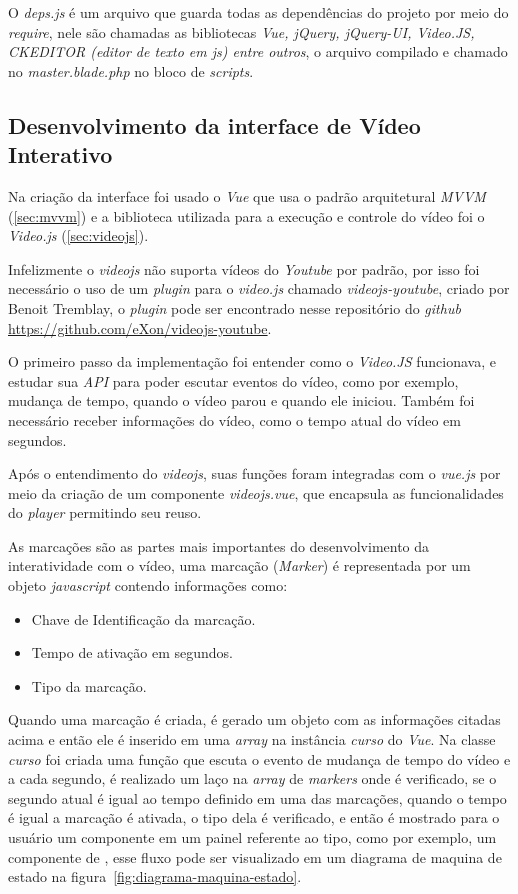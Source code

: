 O \textit{deps.js} é um arquivo que guarda todas as dependências do projeto por meio do \textit{require}, nele são chamadas as bibliotecas \textit{Vue, jQuery, jQuery-UI, Video.JS, CKEDITOR (editor de texto em js) entre outros}, o arquivo compilado e chamado no \textit{master.blade.php} no bloco de \textit{scripts}.

\subsection{Desenvolvimento da interface de Vídeo Interativo}

Na criação da interface foi usado o \textit{Vue} que usa o padrão arquitetural \textit{MVVM} (\autoref{sec:mvvm}) e a biblioteca utilizada para a execução e controle do vídeo foi o \textit{Video.js} (\autoref{sec:videojs}).

Infelizmente o \textit{videojs} não suporta vídeos do \textit{Youtube} por padrão, por isso foi necessário o uso de um \textit{plugin} para o \textit{video.js} chamado \textit{videojs-youtube}, criado por Benoit Tremblay, o \textit{plugin} pode ser encontrado nesse repositório do \textit{github} \url{https://github.com/eXon/videojs-youtube}.

O primeiro passo da implementação foi entender como o \textit{Video.JS} funcionava, e estudar sua \textit{API} para poder escutar eventos do vídeo, como por exemplo, mudança de tempo, quando o vídeo parou e quando ele iniciou. Também foi necessário receber informações do vídeo, como o tempo atual do vídeo em segundos.

Após o entendimento do \textit{videojs}, suas funções foram integradas com o \textit{vue.js} por meio da criação de um componente \textit{videojs.vue}, que encapsula as funcionalidades do \textit{player} permitindo seu reuso.

As marcações são as partes mais importantes do desenvolvimento da interatividade com o vídeo, uma marcação (\textit{Marker}) é representada por um objeto \textit{javascript} contendo informações como:
\begin{itemize}
    \item Chave de Identificação da marcação.
    \item Tempo de ativação em segundos.
    \item Tipo da marcação.
\end{itemize}

Quando uma marcação é criada, é gerado um objeto com as informações citadas acima e então ele é inserido em uma \textit{array} na instância \textit{curso} do \textit{Vue}. Na classe \textit{curso} foi criada uma função que escuta o evento de mudança de tempo do vídeo e a cada segundo, é realizado um laço na \textit{array} de \textit{markers} onde é verificado, se o segundo atual é igual ao tempo definido em uma das marcações, quando o tempo é igual a marcação é ativada, o tipo dela é verificado, e então é mostrado para o usuário um componente em um painel referente ao tipo, como por exemplo, um componente de , esse fluxo pode ser visualizado em um diagrama de maquina de estado na figura~\ref{fig:diagrama-maquina-estado}.
\newpage

